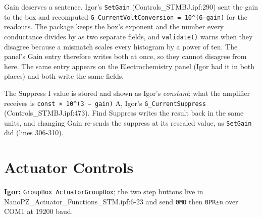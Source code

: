 Gain deserves a sentence. Igor's \texttt{Set\discretionary{}{}{}Gain} (Controls\_STMBJ.ipf:290) sent the gain to the box and recomputed \texttt{G\_\discretionary{}{}{}Current\discretionary{}{}{}Volt\discretionary{}{}{}Conversion = 10\textasciicircum{}(6-gain)} for the readouts. The package keeps the box's exponent and the number every conductance divides by as two separate fields, and \texttt{validate()} warns when they disagree because a mismatch scales every histogram by a power of ten. The panel's Gain entry therefore writes both at once, so they cannot disagree from here. The same entry appears on the Electrochemistry panel (Igor had it in both places) and both write the same fields.

The Suppress I value is stored and shown as Igor's \emph{constant}; what the amplifier receives is \texttt{const × 10\textasciicircum{}(3 − gain)} \textmu{}A, Igor's \texttt{G\_\discretionary{}{}{}Current\discretionary{}{}{}Suppress} (Controls\_STMBJ.ipf:473). Find Suppress writes the result back in the same units, and changing Gain re-sends the suppress at its rescaled value, as \texttt{Set\discretionary{}{}{}Gain} did (lines 306-310).

\section{Actuator Controls}

\textbf{Igor:} \texttt{Group\discretionary{}{}{}Box Actuator\discretionary{}{}{}Group\discretionary{}{}{}Box}; the two step buttons live in NanoPZ\_Actuator\_Functions\_STM.ipf:6-23 and send \texttt{0MO} then \texttt{0PR±n} over COM1 at 19200 baud.

